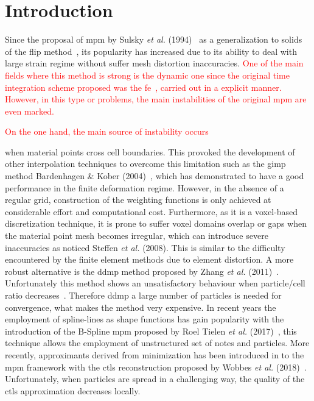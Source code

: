\documentclass[preprint,12pt,a4paper]{elsarticle}
\newcommand{\red}[1]{
  \textcolor{red}{{#1}}
}
\begin{document}
\linenumbers

\section{Introduction}
\label{intro}
Since the proposal of \acrshort{mpm} by Sulsky {\it  et al.}
(1994)~\cite{Sulsky1994} as a generalization to solids of the \acrfull{flip} method~\cite{Brackbill1986}, its popularity
has increased due to its ability to deal with large strain regime
without suffer mesh distortion inaccuracies. \red{One of the main fields where this method is strong is the dynamic one since the original time integration scheme proposed was the \acrfull{fe}~\cite{Sulsky1994}, carried out in a explicit manner. However, in this type or problems, the main instabilities of the original \acrshort{mpm} are even marked.}

 \red{On the one hand, the main source of instability occurs}
when material points cross cell boundaries. This  provoked the
development of other interpolation techniques to overcome this
limitation such as the \acrfull{gimp} method Bardenhagen \& Kober
(2004)~\cite{Bardenhagen2004}, which has
demonstrated to have a good performance in the finite deformation
regime. However, in the absence of a regular grid, construction of the
weighting functions is only achieved at considerable effort and
computational cost.  Furthermore, as it is a voxel-based
discretization technique, it is prone to suffer voxel domains overlap
or gaps when the material point mesh becomes irregular, which can
introduce severe inaccuracies as noticed Steffen {\it et al.}
(2008)\cite{Steffen2008}. This is similar to the difficulty
encountered by the finite element methods due to element distortion.
A more robust alternative is the \acrfull{ddmp} method proposed by Zhang {\it et al.}
(2011)~\cite{Zhang2011a}. Unfortunately this method shows an
unsatisfactory behaviour when particle/cell ratio
decreases~\cite{DHAKAL2016301}. Therefore \acrshort{ddmp} a large number of particles is needed for convergence, what
makes the method very expensive. In recent years the employment of
spline-lines as shape functions has gain popularity with the introduction of the B-Spline 
\acrshort{mpm} proposed by Roel Tielen {\it et al.} (2017)~\cite{TIELEN2017265},
this technique allows the employment of unstructured set of notes and
particles. More recently, approximants derived from minimization has
been introduced in to the \acrshort{mpm} framework with the \acrfull{ctls}
reconstruction proposed by Wobbes {\it et al.}
(2018)~\cite{E_Wobbes_2018}. Unfortunately, when particles are spread in
a challenging way, the quality of the \acrshort{ctls} approximation decreases locally.
\end{document}
